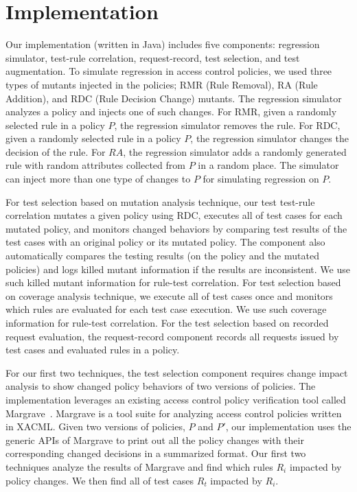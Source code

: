 \section{Implementation} \label{sec:implementation}

Our implementation (written in Java) includes five components: regression simulator, test-rule correlation, request-record, test selection,
and test augmentation. To simulate regression in access control policies, 
we used three types of mutants injected in the policies; RMR (Rule Removal), RA (Rule Addition), and RDC (Rule Decision Change)
mutants. The regression simulator analyzes a policy and injects one
of such changes. For RMR, given a randomly selected rule in a policy $P$,
the regression simulator removes the rule. For RDC, given a randomly selected rule in a policy $P$, the regression simulator changes
the decision of the rule. For $RA$, the regression simulator adds a randomly generated rule with random attributes collected from $P$ in a random place.
The simulator can inject more than one type of changes to $P$ for simulating regression on $P$.

For test selection based on mutation analysis technique,
our test test-rule correlation mutates a given policy using RDC, executes all of test cases for each mutated policy, and monitors changed
behaviors by comparing test results of the test cases with an original policy or its mutated policy.
The component also automatically compares the testing results (on the policy and the mutated policies) and logs killed mutant information if the results are inconsistent. We use
such killed mutant information for rule-test correlation.
For test selection based on coverage analysis technique, we execute all of test cases once and monitors
which rules are evaluated for each test case execution. We use such coverage information for rule-test correlation.
For the test selection based on recorded request evaluation,
the request-record component records all requests issued by test cases and evaluated rules in a policy.

For our first two techniques, the test selection component requires change impact analysis to
show changed policy behaviors of two versions of policies.
The implementation leverages an existing access control policy verification tool called Margrave~\cite{fisler05:verification}. 
Margrave is a tool suite for analyzing access control policies written in XACML.
Given two versions of policies, $P$ and $P'$, 
our implementation uses the generic APIs of Margrave to
print out all the policy changes with their corresponding changed decisions in a summarized format.
Our first two techniques analyze the results of Margrave and
find which rules $R_i$ impacted by policy changes. We then find all of test cases $R_t$
impacted by $R_i$.

